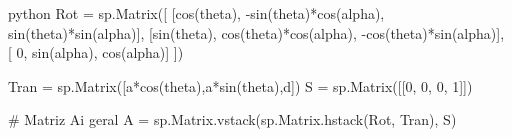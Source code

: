 \begin{mintedbox}{python}
Rot = sp.Matrix([
    [cos(theta), -sin(theta)*cos(alpha),  sin(theta)*sin(alpha)],
    [sin(theta), cos(theta)*cos(alpha), -cos(theta)*sin(alpha)],
    [ 0, sin(alpha), cos(alpha)]
                ])

Tran = sp.Matrix([a*cos(theta),a*sin(theta),d])
S = sp.Matrix([[0, 0, 0, 1]])

# Matriz Ai geral
A = sp.Matrix.vstack(sp.Matrix.hstack(Rot, Tran), S)
\end{mintedbox}